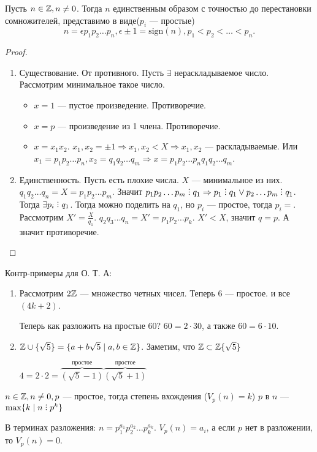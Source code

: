 \begin{theorem}
    Пусть $n \in \mathbb{Z}, n \neq 0$. Тогда  $n$ единственным образом с точностью до перестановки сомножителей, представимо в виде($p_i$ --- простые)  \[
        n = \epsilon p_1p_2\ldots p_n, \epsilon \pm 1 = \text{sign}(n), p_1 < p_2 < \ldots < p_n
    .\] 
\end{theorem}
\begin{proof}
\begin{enumerate}
    \item Существование. От противного. Пусть $\exists$ нераскладываемое число. Рассмотрим минимальное такое число.
        \begin{itemize}
            \item $x = 1$ --- пустое произведение. Противоречие.
            \item  $x = p$ --- произведение из 1 члена. Противоречие.
            \item  $x = x_1x_2$. $x_1,x_2 = \pm 1 \Rightarrow x_1, x_2 < X \Rightarrow x_1, x_2$ --- раскладываемые. Или $x_1 = p_1 p_2\ldots p_n, x_2 = q_1 q_2 \ldots q_m \Rightarrow x = p_1 p_2 \ldots p_n q_1 q_2 \ldots q_m$.
        \end{itemize}
    \item Единственность. Пусть есть плохие числа. $X$ --- минимальное из них.  $q_1 q_2 \ldots q_n = X = p_1 p_2 \ldots p_m$. Значит $p_1 p_2 \ldots p_m \divby q_1 \Rightarrow p_1 \divby q_1 \lor p_2\ldots p_m \divby q_1$. Тогда $\exists p_i \divby q_1$. Тогда можно поделить на  $q_1$, но $p_i$ --- простое, тогда  $p_i = $. Рассмотрим  $X' = \frac{X}{q_1}$. $q_2 q_3 \ldots q_n = X' = p_1 p_2 \ldots p_k$. $X' < X$, значит  $q = p$. А значит противоречие. 
\end{enumerate}
\end{proof}
Контр-примеры для О. Т. А:
\begin{enumerate}
    \item Рассмотрим $2\mathbb{Z}$ --- множество четных чисел. Теперь 6 --- простое. и все $(4k + 2)$.

        Теперь как разложить на простые 60?  $60 = 2 \cdot 30$, а также  $60 = 6 \cdot 10$.
    \item $\mathbb{Z} \cup \{\sqrt{5}\} = \{ a + b\sqrt{5} \mid a,b \in \mathbb{Z}\}$. Заметим, что  $\mathbb{Z} \subset \mathbb{Z}\{\sqrt{5}\}$

        $4 = 2 \cdot 2 = \overbrace{(\sqrt{5} - 1)}^{\text{простое}}\overbrace{(\sqrt{5} + 1)}^{\text{простое}}$
\end{enumerate}
\begin{definition}
    $n \in \mathbb{Z}, n \neq 0, p$ --- простое, тогда степень вхождения ($V_p(n) = k$)  $p$ в  $n$ ---  $\max\{k \mid n \divby p^k\}$

    В терминах разложения: $n = p_1^{a_1} p_2^{a_2} \ldots p_k^{a_k}$. $V_p(n) = a_i$, а если  $p$ нет в разложении, то  $V_p(n) = 0$.
\end{definition}
